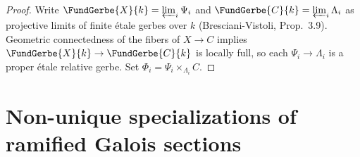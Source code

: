 \begin{proof}
  Write \(\FundGerbe{X}{k} = \varprojlim_i \Psi_i\) and \(\FundGerbe{C}{k} = \varprojlim_i \Lambda_i\)
  as projective limits of finite étale gerbes over \(k\) (Bresciani-Vistoli, Prop.\ 3.9).
  Geometric connectedness of the fibers of \(X \to C\) implies
  \(\FundGerbe{X}{k} \to \FundGerbe{C}{k}\) is locally full, so each
  \(\Psi_i \to \Lambda_i\) is a proper étale relative gerbe. Set
  \(\Phi_i = \Psi_i \times_{\Lambda_i} C\).
\end{proof}

\section{Non-unique specializations of ramified Galois sections}


